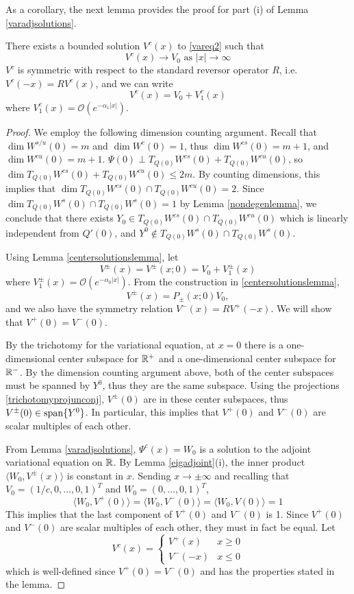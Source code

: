 \documentclass[thesis.tex]{subfiles}
\begin{document}
As a corollary, the next lemma provides the proof for part (i) of Lemma \ref{varadjsolutions}.
 
\begin{lemma}\label{lemma:Vcexists}
There exists a bounded solution $V^c(x)$ to \eqref{vareq2} such that 
\begin{equation*}
V^c(x) \rightarrow V_0 \text{ as }|x| \rightarrow \infty
\end{equation*}
$V^c$ is symmetric with respect to the standard reversor operator $R$, i.e. $V^c(-x) = R V^c(x)$, and we can write
\[
V^c(x) = V_0 + V^c_1(x)
\]
where $V^c_1(x) = \mathcal{O}(e^{-\alpha_1 |x|})$.
\begin{proof}
We employ the following dimension counting argument. Recall that $\dim W^{s/u}(0) = m$ and $\dim W^c(0) = 1$, thus $\dim W^{cs}(0) = m + 1$, and $\dim W^{cu}(0) = m + 1$. $\Psi(0) \perp T_{Q(0)}W^{cs}(0) + T_{Q(0)}W^{cu}(0)$, so $\dim T_{Q(0)}W^{cs}(0) + T_{Q(0)}W^{cu}(0) \leq 2m$. By counting dimensions, this implies that $\dim T_{Q(0)}W^{cs}(0) \cap T_{Q(0)}W^{cu}(0) = 2$. Since $\dim T_{Q(0)}W^s(0) \cap T_{Q(0)}W^s(0) = 1$ by Lemma \ref{nondegenlemma}, we conclude that there exists $Y_0 \in T_{Q(0)}W^{cs}(0) \cap T_{Q(0)}W^{cu}(0)$ which is linearly independent from $Q'(0)$, and $Y^0 \notin T_{Q(0)}W^s(0) \cap T_{Q(0)}W^s(0)$.

Using Lemma \ref{centersolutionslemma}, let
\[
V^\pm(x) = V^\pm(x; 0) = V_0 + V_1^\pm(x)
\]
where $V_1^\pm(x) = \mathcal{O}(e^{-\alpha_0 |x|})$. From the construction in \ref{centersolutionslemma},
\[
V^\pm(x) = P_\pm(x; 0) V_0,
\]
and we also have the symmetry relation $V^-(x) = R V^+(-x)$. We will show that $V^+(0) = V^-(0)$.

By the trichotomy for the variational equation, at $x = 0$ there is a one-dimensional center subspace for $\mathbb{R}^+$ and a one-dimensional center subspace for $\mathbb{R}^-$. By the dimension counting argument above, both of the center subspaces must be spanned by $Y^0$, thus they are the same subspace. Using the projections \eqref{trichotomyprojunconj}, $V^\pm(0)$ are in these center subspaces, thus $V^\pm(0) \in \mathop\mathrm{span}\nolimits \{Y^0 \}$. In particular, this implies that $V^+(0)$ and $V^-(0)$ are scalar multiples of each other. 

From Lemma \ref{varadjsolutions}, $\Psi^c(x) = W_0$ is a solution to the adjoint variational equation on $\mathbb{R}$. By Lemma \ref{eigadjoint}(i), the inner product $\langle W_0, V^\pm(x) \rangle$ is constant in $x$. Sending $x \rightarrow \pm \infty$ and recalling that $V_0 = (1/c, 0, \dots, 0, 1)^T $ and $W_0 = (0, \dots, 0, 1)^T$,
\[
\langle W_0, V^+(0) \rangle = \langle W_0, V^-(0) \rangle
= \langle W_0, V(0) \rangle = 1
\]
This implies that the last component of $V^+(0)$ and $V^-(0)$ is 1. Since $V^+(0)$ and $V^-(0)$ are scalar multiples of each other, they must in fact be equal. Let
\[
V^c(x) = \begin{cases}
V^+(x) & x \geq 0 \\
V^-(-x) & x \leq 0 
\end{cases}
\]
which is well-defined since $V^+(0) = V^-(0)$ and has the properties stated in the lemma.
\end{proof}
\end{lemma}
\end{document}

